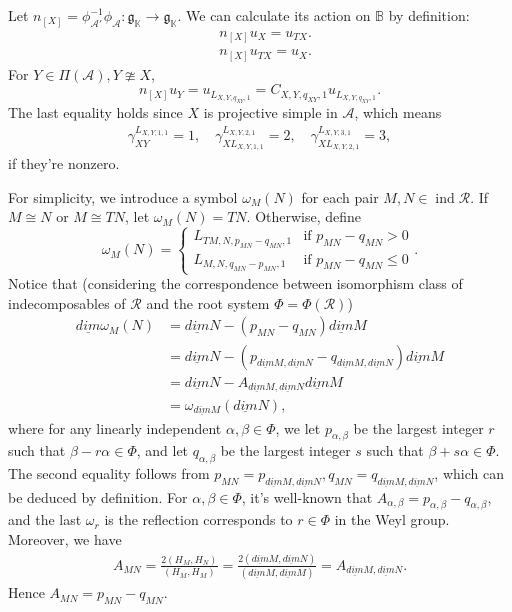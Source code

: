\documentclass[12pt]{amsart}
\begin{document}
Let $n_{[X]} = \phi_{\mathcal{A}'}^{-1} \phi_{\mathcal{A}}:\mathfrak{g}_{\mathbb{K}} \rightarrow \mathfrak{g}_{\mathbb{K}}$.
We can calculate its action on $\mathbb{B}$ by definition:
\begin{align*}
    &n_{[X]}u_{X} = u_{TX}. \\
    &n_{[X]}u_{TX} = u_X .
\end{align*}
For $Y\in \Pi(\mathcal{A}), Y \ncong X$,
\begin{equation*}
    n_{[X]}u_Y =  u_{L_{X,Y,q_{XY},1}} = C_{X,Y,q_{XY},1}   u_{L_{X,Y,q_{XY},1}} .
\end{equation*}
The last equality holds since $X$ is projective simple in $\mathcal{A}$, which means
 \begin{align*}
     \gamma_{XY}^{L_{X,Y,1,1}} = 1, \quad \gamma_{XL_{X,Y,1,1}}^{L_{X,Y,2,1}} = 2, \quad \gamma_{XL_{X,Y,2,1}}^{L_{X,Y,3,1}} = 3,
 \end{align*}
if they're nonzero.

For simplicity, we introduce a symbol $\omega_M(N)$ for each pair $M,N \in \operatorname{ind}\mathcal{R}$.
If $M \cong N$ or $M \cong TN$, let $\omega_M(N) = TN$.
Otherwise, define
\begin{equation*}
    \omega_M(N) = 
    \begin{cases}
        L_{TM,N,p_{MN}-q_{MN},1}  &  \text{if } p_{MN}-q_{MN} >0 \\
        L_{M,N,q_{MN}-p_{MN},1}  &  \text{if } p_{MN}-q_{MN} \leqslant 0
    \end{cases}
    .
\end{equation*}
Notice that (considering the correspondence between isomorphism class of indecomposables of $\mathcal{R}$ and the root system $\Phi = \Phi(\mathcal{R})$)
\begin{align*}
  \underline{dim} \omega_M(N) &= \underline{dim}N - (p_{MN}-q_{MN}) \underline{dim}M \\
  &= \underline{dim}N - (p_{\underline{dim}M,\underline{dim}N}-q_{\underline{dim}M,\underline{dim}N}) \underline{dim}M \\
  &=\underline{dim}N - A_{\underline{dim}M,\underline{dim}N}\underline{dim}M\\
  &= \omega_{\underline{dim}M}(\underline{dim}N) ,   
\end{align*}
where for any linearly independent $\alpha,\beta \in \Phi$, we let $p_{\alpha,\beta}$ be the largest integer $r$ such that $\beta - r\alpha\in \Phi$, 
and let $q_{\alpha,\beta}$ be the largest integer $s$ such that $\beta + s\alpha\in \Phi$.
The second equality follows from $p_{MN} = p_{\underline{dim}M,\underline{dim}N},q_{MN} = q_{\underline{dim}M,\underline{dim}N}$, which can be deduced by definition.
For $\alpha,\beta \in \Phi$, it's well-known that $A_{\alpha,\beta} = p_{\alpha,\beta} - q_{\alpha,\beta}$, 
and the last $\omega_r$ is the reflection corresponds to $r\in \Phi$ in the Weyl group.
Moreover, we have 
\begin{align*}
    A_{MN} = \frac{2(H_M,H_N)}{(H_M,H_M)} = \frac{2(\underline{dim}M,\underline{dim}N)}{(\underline{dim}M,\underline{dim}M)} = A_{\underline{dim}M,\underline{dim}N}.
\end{align*}
Hence $A_{MN} = p_{MN} - q_{MN}$.
\end{document}
